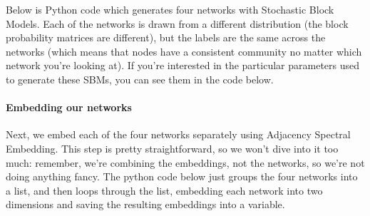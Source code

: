 \documentclass[letterpaper,10pt,english]{jupyterBook}
\begin{document}
\sphinxAtStartPar
Below is Python code which generates four networks with Stochastic Block Models. Each of the networks is drawn from a different distribution (the block probability matrices are different), but the labels are the same across the networks (which means that nodes have a consistent community no matter which network you’re looking at). If you’re interested in the particular parameters used to generate these SBMs, you can see them in the code below.

\begin{sphinxVerbatim}[commandchars=\\\{\}]
   
   

  
      
       
     
     
     

  \PYG{p}{[}   \PYG{p}{]}
\end{sphinxVerbatim}

\noindent{}


\paragraph{Embedding our networks}
\label{\detokenize{representations/ch6/multigraph-representation-learning:embedding-our-networks}}
\sphinxAtStartPar
Next, we embed each of the four networks separately using Adjacency Spectral Embedding. This step is pretty straightforward, so we won’t dive into it too much: remember, we’re combining the embeddings, not the networks, so we’re not doing anything fancy. The python code below just groups the four networks into a list, and then loops through the list, embedding each network into two dimensions and saving the resulting embeddings into a variable.
\end{document}
